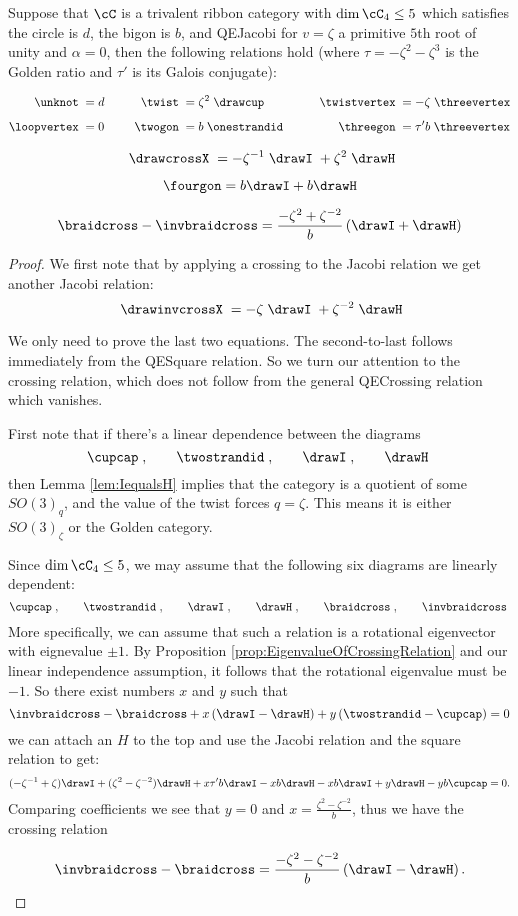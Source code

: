 \documentclass[12pt]{amsart}
\begin{document}
\begin{proposition}\label{prop:5throot}
Suppose that $\cC$ is a trivalent ribbon category with $\dim \cC_4 \leq 5$ which satisfies the circle is $d$, the bigon is $b$, and QEJacobi for $v = \zeta$ a primitive $5$th root of unity and $\alpha = 0$, then the following relations hold (where $\tau = -\zeta^2-\zeta^3$ is the Golden ratio and $\tau'$ is its Galois conjugate):

  \begin{align*}
    \unknot\; &= d&\qquad
      \twist\; &= \zeta^2 \;\drawcup&\qquad
        \twistvertex\; &= -\zeta\;\threevertex\\[5pt]
    \loopvertex\;&=0&
      \twogon\;&= b\;\onestrandid&
        \threegon\; &= \tau' b \;\threevertex
  \end{align*}


\[\;
\drawcrossX
\; = - \zeta^{-1} \;
\drawI
\; + \zeta^2 \;
 \drawH
\]

\[
\fourgon =  b \drawI + b \drawH 
\]

\[
\braidcross - \invbraidcross = \frac{-\zeta^2 + \zeta^{-2}}{b} \left(\drawI + \drawH\right)
\]
\end{proposition}
\begin{proof}
We first note that by applying a crossing to the Jacobi relation we get another Jacobi relation:
\[\;
\drawinvcrossX
\; = - \zeta \;
\drawI
\; + \zeta^{-2} \;
 \drawH
\]

We only need to prove the last two equations.  The second-to-last follows immediately from the QESquare relation.  So we turn our attention to the crossing relation, which does not follow from the general QECrossing relation which vanishes.


First note that if there's a linear dependence between the diagrams
 \[
  \cupcap\;,\qquad\twostrandid\;,
    \qquad\drawI\;,\qquad\drawH\; \]
then Lemma \ref{lem:IequalsH} implies that the category is a quotient of some $SO(3)_q$, and the value of the twist forces $q = \zeta$.  This means it is either $SO(3)_{\zeta}$ or the Golden category.

Since $\dim \cC_4 \leq 5$, we may assume that the following six diagrams are linearly dependent:
 \[
  \cupcap\;,\qquad\twostrandid\;,
    \qquad\drawI\;,\qquad\drawH\;,\qquad\braidcross\;,\qquad \invbraidcross\;
   \]
More specifically, we can assume that such a relation is a rotational eigenvector with eignevalue $\pm 1$.  By Proposition \ref{prop:EigenvalueOfCrossingRelation} and our linear independence assumption, it follows that the rotational eigenvalue must be $-1$.  So there exist numbers $x$ and $y$ such that
\[\invbraidcross - \braidcross + x\left(\drawI - \drawH\right) + y \left(\twostrandid -\cupcap\right)=0\]
we can attach an $H$ to the top and use the Jacobi relation and the square relation to get:
\[
(-\zeta^{-1} + \zeta)\drawI + (\zeta^2 - \zeta^{-2})\drawH + x \tau' b \drawI - x b \drawH - x b \drawI + y \drawH - y b \cupcap = 0.
\]
Comparing coefficients we see that $y=0$ and $x = \frac{\zeta^2-\zeta^{-2}}{b}$, thus we have the crossing relation

\[\invbraidcross - \braidcross = \frac{-\zeta^2-\zeta^{-2}}{b} \left(\drawI - \drawH\right).\]
\end{proof}
\end{document}
